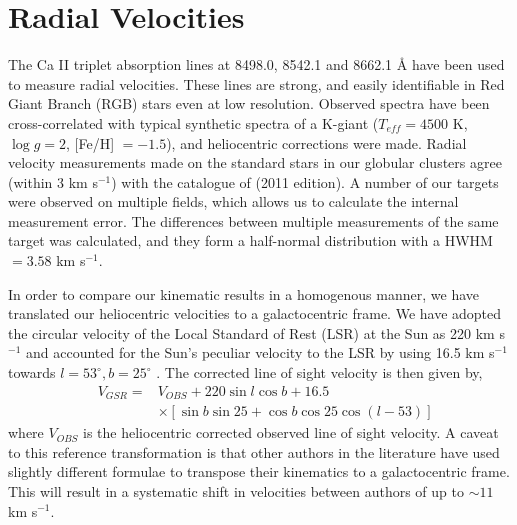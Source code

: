 \documentclass[preprint2]{aastex}
\begin{document}
	
\section{Radial Velocities}
\label{sec:kinematics}

The Ca II triplet absorption lines at 8498.0, 8542.1 and 8662.1 \AA{}  have been used to measure radial velocities. These lines are strong, and easily identifiable in Red Giant Branch (RGB) stars even at low resolution.  Observed spectra have been cross-correlated with typical synthetic spectra of a K-giant ($T_{eff} = 4500$ K, $\log{g} = 2$, [Fe/H] $= -1.5$), and heliocentric corrections were made. Radial velocity measurements made on the standard stars in our globular clusters agree (within 3 km s$^{-1}$) with the catalogue of \citet{Harris_1996} (2011 edition). A number of our targets were observed on multiple fields, which allows us to calculate the internal measurement error. The differences between multiple measurements of the same target was calculated, and they form a half-normal distribution with a HWHM $= 3.58$ km s$^{-1}$. %

	
In order to compare our kinematic results in a homogenous manner, we have translated our heliocentric velocities to a galactocentric frame. We have adopted the circular velocity of the Local Standard of Rest (LSR) at the Sun as 220 km s$^{-1}$ \citep{Kerr;Lynden-Bell_1986} and accounted for the Sun's peculiar velocity to the LSR by using 16.5 km s$^{-1}$ towards $l = 53^\circ, b = 25^\circ$ \citep{Mihalas;Binney_1981}. The corrected line of sight velocity is then given by,
\begin{eqnarray}
	&V_{GSR} = & V_{OBS} + 220\sin{l}\cos{b} + 16.5  \\
	& 		 &\times[\sin{b}\sin{25} + \cos{b}\cos{25}\cos{(l - 53)}] \nonumber
\end{eqnarray}
\noindent where $V_{OBS}$ is the heliocentric corrected observed line of sight velocity. A caveat to this reference transformation is that other authors in the literature have used slightly different formulae to transpose their kinematics to a galactocentric frame. This will result in a systematic shift in velocities between authors of up to $\sim11$ km s$^{-1}$. 
\end{document}
